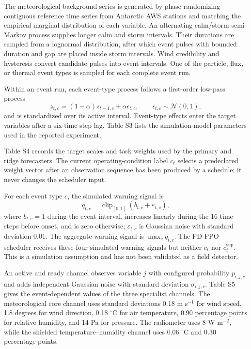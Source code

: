 \documentclass[preprint,12pt]{elsarticle}
\begin{document}
The meteorological background series is generated by phase-randomizing contiguous
reference time series from Antarctic AWS stations and matching the empirical
marginal distribution of each variable. An alternating calm/storm semi-Markov
process supplies longer calm and storm intervals. Their durations are sampled from a lognormal
distribution, after which event pulses with bounded duration and gap are placed
inside storm intervals. Wind credibility and hysteresis convert candidate
pulses into event intervals. One of the particle, flux, or thermal event
types is sampled for each complete event run.

Within an event run, each event-type process follows a first-order
low-pass process
\begin{equation}
  z_{t,c}=(1-\alpha)z_{t-1,c}+\alpha\epsilon_{t,c},
  \qquad \epsilon_{t,c}\sim\mathcal{N}(0,1),
\end{equation}
and is standardized over its active interval. Event-type effects enter the
target variables after a six-time-step lag. Table S3 lists the simulation-model parameters used
in the reported experiment.



Table S4 records the target scales and task weights used by the primary and ridge
forecasters. The current operating-condition label $c_t$ selects a predeclared weight vector after an
observation sequence has been produced by a schedule; it never changes the
scheduler input.



For each event type $c$, the simulated warning signal is
\begin{equation}
  q_{t,c}=\operatorname{clip}_{[0,1]}
  \left(b_{t,c}+\varepsilon_{t,c}\right),
\end{equation}
where $b_{t,c}=1$ during the event interval, increases linearly during the 16
time steps before onset, and is zero otherwise; $\varepsilon_{t,c}$ is Gaussian
noise with standard deviation 0.01. The aggregate warning signal is
$\max_c q_{t,c}$. The PD-PPO scheduler receives these four simulated warning
signals but neither $c_t$ nor $c_t^{\mathrm{sup}}$. This is a simulation assumption
and has not been validated as a field detector.

An active and ready channel observes variable $j$ with configured probability
$p_{i,j,c}$ and adds independent Gaussian noise with standard deviation
$\sigma_{i,j,c}$. Table S5 gives the event-dependent values of the three
specialist channels. The meteorological core channel uses standard deviations
0.18 m s$^{-1}$ for wind speed, 1.8
degrees for wind direction, 0.18 $^{\circ}$C for air temperature, 0.90
percentage points for relative humidity, and 14 Pa for pressure. The radiometer
uses 8 W m$^{-2}$, while the shielded temperature--humidity channel uses 0.06 $^{\circ}$C
and 0.30 percentage points.
\end{document}
